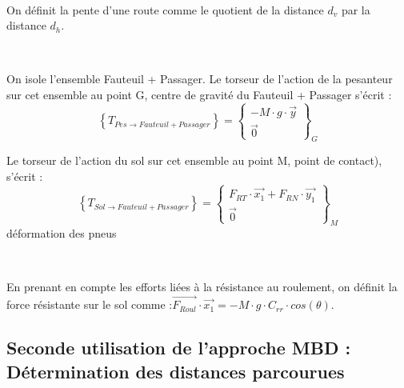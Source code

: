 
~\

On définit la pente d'une route comme le quotient de la distance $d_v$ par la distance $d_h$.


~\

On isole l'ensemble {Fauteuil + Passager}. Le torseur de l'action de la pesanteur sur cet ensemble au point G, centre de gravité du {Fauteuil + Passager} s'écrit :
$$\left\{T_{Pes\rightarrow {Fauteuil+Passager}}\right\}=\left\{\begin{array}{c}-M\cdot g\cdot \vec{y}\\\vec{0}
\end{array}
\right\}_G$$

Le torseur de l'action du sol sur cet ensemble au point M, point de contact), s'écrit :
$$\left\{T_{Sol\rightarrow {Fauteuil+Passager}}\right\}=\left\{\begin{array}{c}F_{RT} \cdot \vec{x_1}+ F_{RN}\cdot \vec{y_1}\\\vec{0}
\end{array}
\right\}_M$$
déformation des pneus

~\

En prenant en compte les efforts liées à la résistance au roulement, on définit la force résistante sur le sol comme :$\overrightarrow{F_{Roul}}\cdot\vec{x_1}=-M\cdot g\cdot C_{rr}\cdot cos(\theta)$.


\subsection{Seconde utilisation de l'approche MBD : Détermination des distances parcourues}

